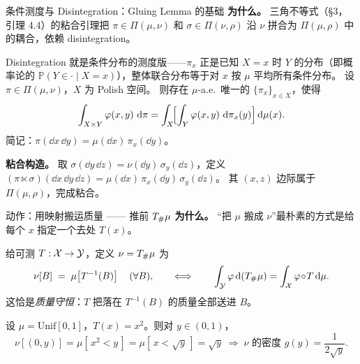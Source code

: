 \begin{frame}{条件测度与 Disintegration：Gluing Lemma 的基础}
  \textbf{为什么。} 三角不等式（§3，引理 4.4）的粘合引理把
  $\pi\in\Pi(\mu,\nu)$ 和 $\sigma\in\Pi(\nu,\rho)$ 沿 $\nu$ 拼合为 $\Pi(\mu,\rho)$ 中的耦合，依赖 disintegration。

   Disintegration 就是条件分布的测度版——$\pi_{x}$ 正是已知 $X=x$ 时 $Y$ 的分布（即概率论的 $\mathbb{P}(Y\in\cdot\mid X=x)$），整体联合分布等于对 $x$ 按 $\mu$ 平均所有条件分布。
   设 $\pi\in\Pi(\mu,\nu)$，$X$ 为 Polish 空间。
  则存在 $\mu$-a.e.\ 唯一的 $\{\pi_{x}\}_{x\in X}$，使得
  \[
    \int_{X\times Y} \varphi(x,y)\,\,\mathrm{d}\pi
    = \int_{X}\!\Bigl[\int_{Y}\varphi(x,y)\,\,\mathrm{d}\pi_{x}(y)\Bigr]\,\mathrm{d}\mu(x).
  \]
  简记：$\pi(\dd x\,\dd y)=\mu(\dd x)\,\pi_{x}(\dd y)$。

  \textbf{粘合构造。} 取 $\sigma(\dd y\,\dd z)=\nu(\dd y)\,\sigma_{y}(\dd z)$，定义
  $(\pi\ltimes\sigma)(\dd x\,\dd y\,\dd z)=\mu(\dd x)\,\pi_{x}(\dd y)\,\sigma_{y}(\dd z)$。
  其 $(x,z)$ 边际属于 $\Pi(\mu,\rho)$，完成粘合。

\end{frame}



\begin{frame}{动作：用映射搬运质量 —— 推前 ${T}_{\#}\mu$}
  \textbf{为什么。} “把 $\mu$ 搬成 $\nu$”最朴素的方式是给每个 $x$ 指定一个去处 $T(x)$。

  \medskip
   给可测 $T:\mathcal{X}\to\mathcal{Y}$，定义 $\nu={T}_{\#}\mu$ 为
  \[
    \nu[B] \;=\; \mu\!\left[T^{-1}(B)\right]\quad(\forall B),
    \qquad\Longleftrightarrow\qquad
    \int_{\mathcal{Y}} \varphi\,\mathrm{d}({T}_{\#}\mu) = \int_{\mathcal{X}} \varphi\!\circ\! T \,\mathrm{d}\mu .
  \]
  这恰是\emph{质量守恒}：$T$ 把落在 $T^{-1}(B)$ 的质量全部送进 $B$。

  \medskip
   设 $\mu=\mathrm{Unif}[0,1]$，$T(x)=x^2$。则对 $y\in(0,1)$，
  \[
    \nu[(0,y)] = \mu[\,x^2<y\,] = \mu[\,x<\sqrt y\,] = \sqrt y
    \;\Rightarrow\; \nu \text{ 的密度 } g(y)=\frac{1}{2\sqrt y}.
  \]
\end{frame}

